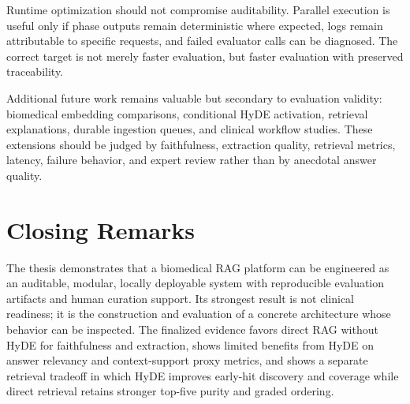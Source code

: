 Runtime optimization should not compromise auditability. Parallel execution is useful only if phase outputs remain deterministic where expected, logs remain attributable to specific requests, and failed evaluator calls can be diagnosed. The correct target is not merely faster evaluation, but faster evaluation with preserved traceability.

Additional future work remains valuable but secondary to evaluation validity: biomedical embedding comparisons, conditional HyDE activation, retrieval explanations, durable ingestion queues, and clinical workflow studies. These extensions should be judged by faithfulness, extraction quality, retrieval metrics, latency, failure behavior, and expert review rather than by anecdotal answer quality.

\section{Closing Remarks}

The thesis demonstrates that a biomedical RAG platform can be engineered as an auditable, modular, locally deployable system with reproducible evaluation artifacts and human curation support. Its strongest result is not clinical readiness; it is the construction and evaluation of a concrete architecture whose behavior can be inspected. The finalized evidence favors direct RAG without HyDE for faithfulness and extraction, shows limited benefits from HyDE on answer relevancy and context-support proxy metrics, and shows a separate retrieval tradeoff in which HyDE improves early-hit discovery and coverage while direct retrieval retains stronger top-five purity and graded ordering.
